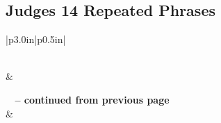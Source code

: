 \subsection{Judges 14 Repeated Phrases}


\normalsize
 
\begin{center}
\begin{longtable}{|p{3.0in}|p{0.5in}|}
\caption[Judges 14 Repeated Phrases]{Judges 14 Repeated Phrases}\label{table:Repeated Phrases Judges 14} \\
\hline {} &  \\ \hline 
\endfirsthead
 
{{\bfseries \tablename\ \thetable{} -- continued from previous page}} \\  
\hline {} &  \\ \hline 
\endhead
 

\end{longtable}
\end{center}
